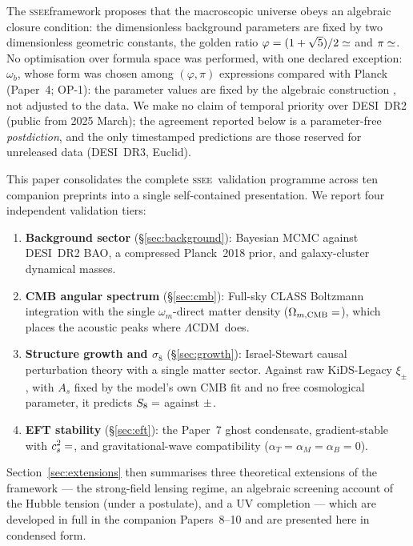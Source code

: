 \documentclass[12pt,a4paper]{article}
\newcommand{\SSEE}{\textsc{ssee}}
\newcommand{\LCDM}{$\Lambda$CDM}
\newcommand{\phiG}{\varphi}
\newcommand{\OmmCMB}{\Omega_{m,\mathrm{CMB}}}
\newcommand{\alphaB}{\alpha_B}
\newcommand{\alphaM}{\alpha_M}
\newcommand{\alphaT}{\alpha_T}
\begin{document}
The \SSEE framework proposes that the macroscopic universe obeys an
algebraic closure condition: the dimensionless background parameters are
fixed by two dimensionless geometric constants, the golden ratio
$\phiG = (1+\sqrt{5})/2 \simeq \val{PHI_d4}$ and $\pi \simeq \val{PI_d4}$.
No optimisation over formula space was performed, with one declared exception: $\omega_b$, whose form was chosen among  $(\varphi,\pi)$ expressions compared with Planck (Paper~4; OP-1): the parameter values are fixed
by the algebraic construction \citep{AlmeidaSSEE2026genesis}, not adjusted to the
data. We make no claim of temporal priority over DESI~DR2 (public from 2025 March);
the agreement reported below is a parameter-free \emph{postdiction}, and the only
timestamped predictions are those reserved for unreleased data (DESI~DR3, Euclid).

This paper consolidates the complete \SSEE\ validation programme across
ten companion preprints \citep{AlmeidaSSEE2026P1,AlmeidaSSEE2026P2,
AlmeidaSSEE2026P3,AlmeidaSSEE2026P4,AlmeidaSSEE2026P5,AlmeidaSSEE2026P6,
AlmeidaSSEE2026P7,AlmeidaSSEE2026P8,AlmeidaSSEE2026P9,AlmeidaSSEE2026P10}
into a single self-contained presentation.
We report four independent validation tiers:
\begin{enumerate}[leftmargin=*,itemsep=1pt]
\item \textbf{Background sector} (\S\ref{sec:background}): Bayesian MCMC
  against DESI~DR2 BAO, a compressed Planck~2018 prior, and galaxy-cluster
  dynamical masses.
\item \textbf{CMB angular spectrum} (\S\ref{sec:cmb}): Full-sky CLASS Boltzmann
  integration with the single $\omega_m$-direct matter density
  ($\OmmCMB=\val{OMEGA_M_TOTAL_d6}$), which places the acoustic peaks where \LCDM\ does.
\item \textbf{Structure growth and $\sigma_8$} (\S\ref{sec:growth}): Israel-Stewart
  causal perturbation theory with a single matter sector. Against raw
  KiDS-Legacy $\xi_\pm$, with $A_s$ fixed by the model's own CMB fit and no free
  cosmological parameter, it predicts $S_8=\val{S8_leg_pred}$ against $\val{S8_legacy_dato}\pm\val{S8_legacy_dato_sigma}$.
\item \textbf{EFT stability} (\S\ref{sec:eft}): the Paper~7 ghost condensate,
  gradient-stable with $c_s^2=\val{cs2_condensado_d6}$, and gravitational-wave compatibility
  ($\alphaT = \alphaM = \alphaB = 0$).
\end{enumerate}
Section~\ref{sec:extensions} then summarises three theoretical extensions of the
framework --- the strong-field lensing regime, an algebraic screening account of
the Hubble tension (under a postulate), and a UV completion --- which are developed in full in the
companion Papers~8--10 and are presented here in condensed form.
\end{document}
